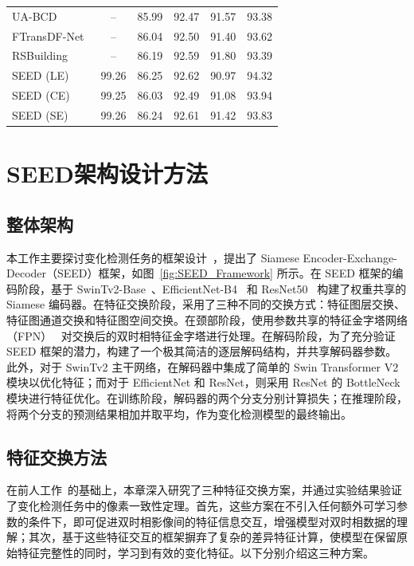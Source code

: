 \begin{table}[!htb]
\begin{tabular}{lccccc}
UA-BCD~\cite{li_overcoming_2025}           & --    & 85.99 & 92.47 & 91.57 & 93.38 \\
FTransDF-Net~\cite{li_dual_2025}           & --    & 86.04 & 92.50 & 91.40 & 93.62 \\
RSBuilding~\cite{wang_rsbuilding_2024}     & --    & 86.19 & 92.59 & 91.80 & 93.39 \\
\hline
SEED (LE)                                      & 99.26 & 86.25 & 92.62 & 90.97 & 94.32 \\
SEED (CE) & 99.25	& 86.03	& 92.49	& 91.08	& 93.94 \\
SEED (SE) & 99.26	& 86.24	& 92.61	& 91.42	& 93.83 \\
\hline
\end{tabular}
\end{table}

\section{SEED架构设计方法}
\subsection{整体架构}  
本工作主要探讨变化检测任务的框架设计~\cite{dong_efficientcd_2024, Fang2022ChangerFI, zhao_exchanging_2023}，提出了 Siamese Encoder-Exchange-Decoder（SEED）框架，如图~\ref{fig:SEED_Framework} 所示。在 SEED 框架的编码阶段，基于 SwinTv2-Base~\cite{liu_swin_2021-5}、EfficientNet-B4~\cite{tan_efficientnet_2019} 和 ResNet50~\cite{He2015DeepRL} 构建了权重共享的 Siamese 编码器。在特征交换阶段，采用了三种不同的交换方式：特征图层交换、特征图通道交换和特征图空间交换。在颈部阶段，使用参数共享的特征金字塔网络（FPN）~\cite{lin_feature_2017} 对交换后的双时相特征金字塔进行处理。在解码阶段，为了充分验证 SEED 框架的潜力，构建了一个极其简洁的逐层解码结构，并共享解码器参数。此外，对于 SwinTv2 主干网络，在解码器中集成了简单的 Swin Transformer V2 模块以优化特征；而对于 EfficientNet 和 ResNet，则采用 ResNet 的 BottleNeck 模块进行特征优化。在训练阶段，解码器的两个分支分别计算损失；在推理阶段，将两个分支的预测结果相加并取平均，作为变化检测模型的最终输出。

\subsection{特征交换方法}  
在前人工作~\cite{dong_efficientcd_2024, Fang2022ChangerFI, zhao_exchanging_2023}的基础上，本章深入研究了三种特征交换方案，并通过实验结果验证了变化检测任务中的像素一致性定理。首先，这些方案在不引入任何额外可学习参数的条件下，即可促进双时相影像间的特征信息交互，增强模型对双时相数据的理解；其次，基于这些特征交互的框架摒弃了复杂的差异特征计算，使模型在保留原始特征完整性的同时，学习到有效的变化特征。以下分别介绍这三种方案。

